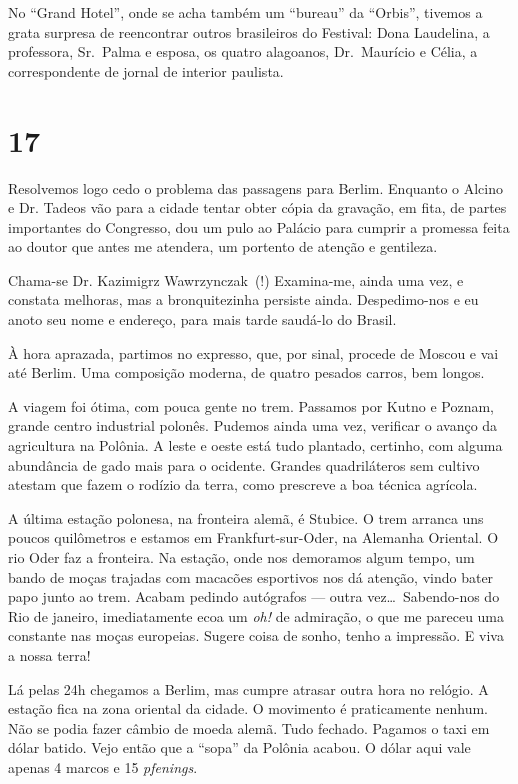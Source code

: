 No ``Grand Hotel'', onde se acha também um ``bureau'' da ``Orbis'', tivemos a grata surpresa de reencontrar outros brasileiros do Festival: Dona Laudelina, a professora, Sr.~Palma e esposa, os quatro alagoanos, Dr.~Maurício e Célia, a correspondente de jornal de interior paulista.

\section*{17 \adfflatleafright {}}
Resolvemos logo cedo o problema das passagens para Berlim. Enquanto o Alcino e Dr. Tadeos vão para a cidade tentar obter cópia da gravação, em fita, de partes importantes do Congresso, dou um pulo ao Palácio para cumprir a promessa feita ao doutor que antes me atendera, um portento de atenção e gentileza.

Chama-se Dr. Kazimigrz Wawrzynczak~(!) Examina-me, ainda uma vez, e constata melhoras, mas a bronquitezinha persiste ainda. Des\-pe\-di\-mo-nos e eu anoto seu nome e endereço, para mais tarde saudá-lo do Brasil.

À hora aprazada, partimos no expresso, que, por sinal, procede de Moscou e vai até Berlim. Uma composição moderna, de quatro pesados carros, bem longos.

A viagem foi ótima, com pouca gente no trem. Passamos por Kutno e Poznam, grande centro industrial polonês. Pudemos ainda uma vez, verificar o avanço da agricultura na Polônia. A leste e oeste está tudo plantado, certinho, com alguma abundância de gado mais para o ocidente. Grandes quadriláteros sem cultivo atestam que fazem o rodízio da terra, como prescreve a boa técnica agrícola.

A última estação polonesa, na fronteira alemã, é Stubice. O trem arranca uns poucos quilômetros e estamos em Frankfurt-sur-Oder, na Alemanha Oriental. O rio Oder faz a fronteira. Na estação, onde nos demoramos algum tempo, um bando de moças trajadas com macacões esportivos nos dá atenção, vindo bater papo junto ao trem. Acabam pedindo autógrafos --- outra vez\ldots\ Sabendo-nos do Rio de janeiro, imediatamente ecoa um \textit{oh!} de admiração, o que me pareceu uma constante nas moças europeias. Sugere coisa de sonho, tenho a impressão. E viva a nossa terra!

Lá pelas 24h chegamos a Berlim, mas cumpre atrasar outra hora no relógio. A estação fica na zona oriental da cidade. O movimento é praticamente nenhum. Não se podia fazer câmbio de moeda alemã. Tudo fechado. Pagamos o taxi em dólar batido. Vejo então que a ``sopa'' da Polônia acabou. O dólar aqui vale apenas 4 marcos e 15 \textit{pfenings}.

